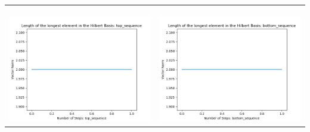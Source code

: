 \documentclass[10pt]{article}
\begin{document}
\begin{tabular}{c|c}
\begin{minipage}{.45\textwidth}
\end{minipage} \\ \\
\hline \\\begin{minipage}{.45\textwidth}
\includegraphics[width=\textwidth]{"DATA/5d/5 generators 1 bound C/top_sequence LENGTH"}
\end{minipage} &
\begin{minipage}{.45\textwidth}
\includegraphics[width=\textwidth]{"DATA/5d/5 generators 1 bound C bottomup/bottom_sequence LENGTH"}
\end{minipage}
\end{tabular}
\end{document}
